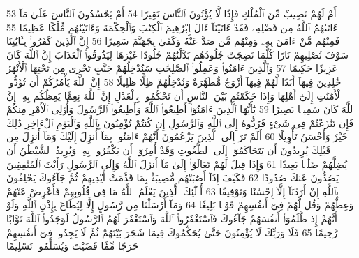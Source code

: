 {\tiny\colorbox{cl_aya}{53}} أَمْ لَهُمْ نَصِيبٌ مِّنَ ٱلْمُلْكِ فَإِذًا لَّا يُؤْتُونَ ٱلنَّاسَ نَقِيرًا
{\tiny\colorbox{cl_aya}{54}} أَمْ يَحْسُدُونَ ٱلنَّاسَ عَلَىٰ مَآ ءَاتَىٰهُمُ ٱللَّهُ مِن فَضْلِهِۦ فَقَدْ ءَاتَيْنَآ ءَالَ إِبْرَٰهِيمَ ٱلْكِتَٰبَ وَٱلْحِكْمَةَ وَءَاتَيْنَٰهُم مُّلْكًا عَظِيمًا
{\tiny\colorbox{cl_aya}{55}} فَمِنْهُم مَّنْ ءَامَنَ بِهِۦ وَمِنْهُم مَّن صَدَّ عَنْهُ وَكَفَىٰ بِجَهَنَّمَ سَعِيرًا
{\tiny\colorbox{cl_aya}{56}} إِنَّ ٱلَّذِينَ كَفَرُوا۟ بِـَٔايَٰتِنَا سَوْفَ نُصْلِيهِمْ نَارًا كُلَّمَا نَضِجَتْ جُلُودُهُم بَدَّلْنَٰهُمْ جُلُودًا غَيْرَهَا لِيَذُوقُوا۟ ٱلْعَذَابَ إِنَّ ٱللَّهَ كَانَ عَزِيزًا حَكِيمًا
{\tiny\colorbox{cl_aya}{57}} وَٱلَّذِينَ ءَامَنُوا۟ وَعَمِلُوا۟ ٱلصَّٰلِحَٰتِ سَنُدْخِلُهُمْ جَنَّٰتٍ تَجْرِى مِن تَحْتِهَا ٱلْأَنْهَٰرُ خَٰلِدِينَ فِيهَآ أَبَدًا لَّهُمْ فِيهَآ أَزْوَٰجٌ مُّطَهَّرَةٌ وَنُدْخِلُهُمْ ظِلًّا ظَلِيلًا
{\tiny\colorbox{cl_aya}{58}} إِنَّ ٱللَّهَ يَأْمُرُكُمْ أَن تُؤَدُّوا۟ ٱلْأَمَٰنَٰتِ إِلَىٰٓ أَهْلِهَا وَإِذَا حَكَمْتُم بَيْنَ ٱلنَّاسِ أَن تَحْكُمُوا۟ بِٱلْعَدْلِ إِنَّ ٱللَّهَ نِعِمَّا يَعِظُكُم بِهِۦٓ إِنَّ ٱللَّهَ كَانَ سَمِيعًۢا بَصِيرًا
{\tiny\colorbox{cl_aya}{59}} يَٰٓأَيُّهَا ٱلَّذِينَ ءَامَنُوٓا۟ أَطِيعُوا۟ ٱللَّهَ وَأَطِيعُوا۟ ٱلرَّسُولَ وَأُو۟لِى ٱلْأَمْرِ مِنكُمْ فَإِن تَنَٰزَعْتُمْ فِى شَىْءٍ فَرُدُّوهُ إِلَى ٱللَّهِ وَٱلرَّسُولِ إِن كُنتُمْ تُؤْمِنُونَ بِٱللَّهِ وَٱلْيَوْمِ ٱلْءَاخِرِ ذَٰلِكَ خَيْرٌ وَأَحْسَنُ تَأْوِيلًا
{\tiny\colorbox{cl_aya}{60}} أَلَمْ تَرَ إِلَى ٱلَّذِينَ يَزْعُمُونَ أَنَّهُمْ ءَامَنُوا۟ بِمَآ أُنزِلَ إِلَيْكَ وَمَآ أُنزِلَ مِن قَبْلِكَ يُرِيدُونَ أَن يَتَحَاكَمُوٓا۟ إِلَى ٱلطَّٰغُوتِ وَقَدْ أُمِرُوٓا۟ أَن يَكْفُرُوا۟ بِهِۦ وَيُرِيدُ ٱلشَّيْطَٰنُ أَن يُضِلَّهُمْ ضَلَٰلًۢا بَعِيدًا
{\tiny\colorbox{cl_aya}{61}} وَإِذَا قِيلَ لَهُمْ تَعَالَوْا۟ إِلَىٰ مَآ أَنزَلَ ٱللَّهُ وَإِلَى ٱلرَّسُولِ رَأَيْتَ ٱلْمُنَٰفِقِينَ يَصُدُّونَ عَنكَ صُدُودًا
{\tiny\colorbox{cl_aya}{62}} فَكَيْفَ إِذَآ أَصَٰبَتْهُم مُّصِيبَةٌۢ بِمَا قَدَّمَتْ أَيْدِيهِمْ ثُمَّ جَآءُوكَ يَحْلِفُونَ بِٱللَّهِ إِنْ أَرَدْنَآ إِلَّآ إِحْسَٰنًا وَتَوْفِيقًا
{\tiny\colorbox{cl_aya}{63}} أُو۟لَٰٓئِكَ ٱلَّذِينَ يَعْلَمُ ٱللَّهُ مَا فِى قُلُوبِهِمْ فَأَعْرِضْ عَنْهُمْ وَعِظْهُمْ وَقُل لَّهُمْ فِىٓ أَنفُسِهِمْ قَوْلًۢا بَلِيغًا
{\tiny\colorbox{cl_aya}{64}} وَمَآ أَرْسَلْنَا مِن رَّسُولٍ إِلَّا لِيُطَاعَ بِإِذْنِ ٱللَّهِ وَلَوْ أَنَّهُمْ إِذ ظَّلَمُوٓا۟ أَنفُسَهُمْ جَآءُوكَ فَٱسْتَغْفَرُوا۟ ٱللَّهَ وَٱسْتَغْفَرَ لَهُمُ ٱلرَّسُولُ لَوَجَدُوا۟ ٱللَّهَ تَوَّابًا رَّحِيمًا
{\tiny\colorbox{cl_aya}{65}} فَلَا وَرَبِّكَ لَا يُؤْمِنُونَ حَتَّىٰ يُحَكِّمُوكَ فِيمَا شَجَرَ بَيْنَهُمْ ثُمَّ لَا يَجِدُوا۟ فِىٓ أَنفُسِهِمْ حَرَجًا مِّمَّا قَضَيْتَ وَيُسَلِّمُوا۟ تَسْلِيمًا
